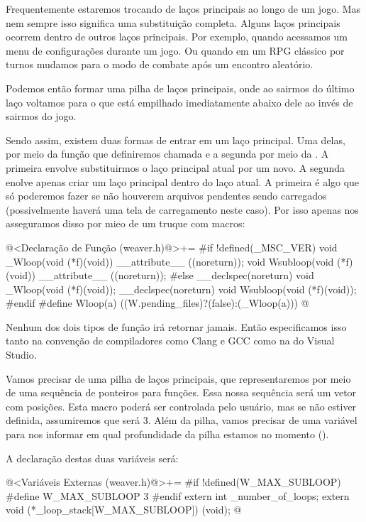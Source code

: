 
Frequentemente estaremos trocando de laços principais ao longo de um
jogo. Mas nem sempre isso significa uma substituição completa. Alguns
laços principais ocorrem dentro de outros laços principais. Por
exemplo, quando acessamos um menu de configurações durante um jogo. Ou
quando em um RPG clássico por turnos mudamos para o modo de combate
após um encontro aleatório.

Podemos então formar uma pilha de laços principais, onde ao sairmos do
último laço voltamos para o que está empilhado imediatamente abaixo
dele ao invés de sairmos do jogo.

Sendo assim, existem duas formas de entrar em um laço principal. Uma
delas, por meio da função que definiremos chamada  e
a segunda por meio da . A primeira envolve
substituirmos o laço principal atual por um novo. A segunda enolve
apenas criar um laço principal dentro do laço atual. A primeira é algo
que só poderemos fazer se não houverem arquivos pendentes sendo
carregados (possivelmente haverá uma tela de carregamento neste
caso). Por isso apenas nos asseguramos disso por mieo de um truque com
macros:

\iniciocodigo
@<Declaração de Função (weaver.h)@>+=
#if !defined(_MSC_VER)
void _Wloop(void (*f)(void)) __attribute__ ((noreturn));
void Wsubloop(void (*f)(void)) __attribute__ ((noreturn));
#else
__declspec(noreturn) void _Wloop(void (*f)(void));
__declspec(noreturn) void Wsubloop(void (*f)(void));
#endif
#define Wloop(a) ((W.pending_files)?(false):(_Wloop(a)))
@
\fimcodigo

Nenhum dos dois tipos de função irá retornar jamais. Então
especificamos isso tanto na convenção de compiladores como Clang e GCC
como na do Visual Studio.

Vamos precisar de uma pilha de laços principais, que representaremos
por meio de uma sequência de ponteiros para funções. Essa nossa
sequência será um vetor com 
posições. Esta macro poderá ser controlada pelo usuário, mas se não
estiver definida, assumiremos que será 3. Além da pilha, vamos
precisar de uma variável para nos informar em qual profundidade da
pilha estamos no momento ().

A declaração destas duas variáveis será:

\iniciocodigo
@<Variáveis Externas (weaver.h)@>+=
#if !defined(W_MAX_SUBLOOP)
#define W_MAX_SUBLOOP 3
#endif
extern int _number_of_loops;
extern void (*_loop_stack[W_MAX_SUBLOOP]) (void);
@
\fimcodigo

